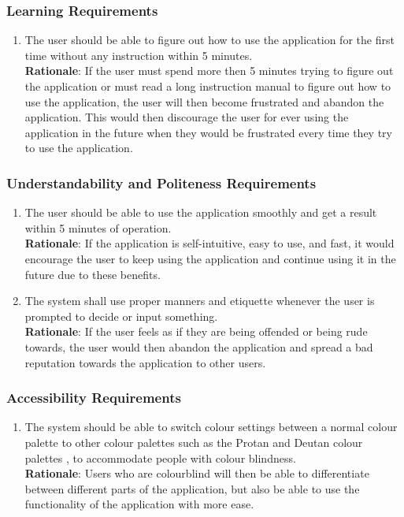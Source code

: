 \subsubsection{Learning Requirements}
\label{ssub:learning_requirements}
\begin{enumerate}[{UH-L}1. ]
	\item The user should be able to figure out how to use the application for the first time without any instruction within 5 minutes.
	\\ \textbf{Rationale}: If the user must spend more then 5 minutes trying to figure out the application or must read a long instruction manual to figure out how to use the application, the user will then become frustrated and abandon the application. This would then discourage the user for ever using the application in the future when they would be frustrated every time they try to use the application.	
\end{enumerate}

\subsubsection{Understandability and Politeness Requirements}
\label{ssub:understandability_and_politeness_requirements}
\begin{enumerate}[{UH-UP}1. ]
	\item The user should be able to use the application smoothly and get a result within 5 minutes of operation.\\ \textbf{Rationale}: If the application is self-intuitive, easy to use, and fast, it would encourage the user to keep using the application and continue using it in the future due to these benefits.
	\item The system shall use proper manners and etiquette whenever the user is prompted to decide or input something.\\ \textbf{Rationale}: If the user feels as if they are being offended or being rude towards, the user would then abandon the application and spread a bad reputation towards the application to other users.
\end{enumerate}


\subsubsection{Accessibility Requirements}
\label{ssub:accessibility_requirements}
\begin{enumerate}[{UH-A}1. ]
	\item The system should be able to switch colour settings between a normal colour palette to other colour palettes such as the Protan and Deutan colour palettes \cite{EnChroma2025}, to accommodate people with colour blindness.
	\\ \textbf{Rationale}: Users who are colourblind will then be able to differentiate between different parts of the application, but also be able to use the functionality of the application with more ease.
	
\end{enumerate}

